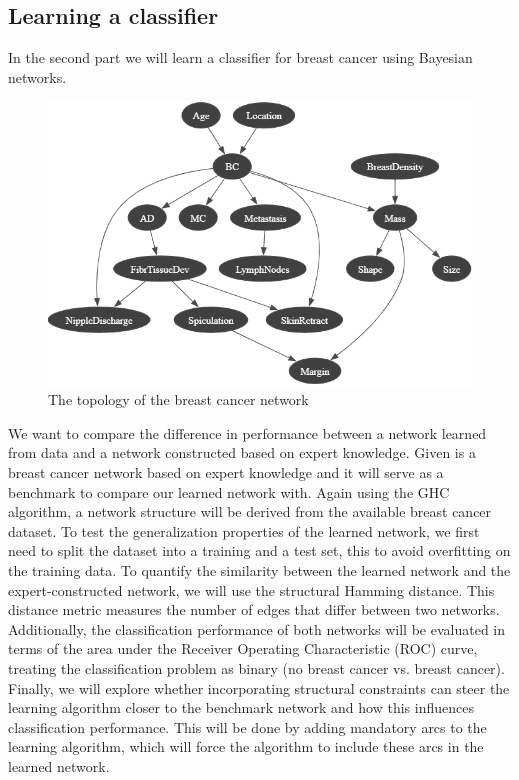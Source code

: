\documentclass{article}
\begin{document}
\subsection{Learning a classifier}
In the second part we will learn a classifier for breast cancer using Bayesian networks.
\begin{figure}[H]
    \centering
    \includegraphics[width=\textwidth]{../figures/Breast_cancer_network_topology.png}
    \caption{The topology of the breast cancer network}
    \label{fig:top_breast}
\end{figure}
We want to compare the difference in performance between a network learned from data and a network constructed based on expert knowledge.
Given is a breast cancer network based on expert knowledge and it will serve as a benchmark to compare our learned network with.
Again using the GHC algorithm, a network structure will be derived from the available breast cancer dataset.
To test the generalization properties of the learned network, we first need to split the dataset into a training and a test set, this to avoid overfitting on the training data.
To quantify the similarity between the learned network and the expert-constructed network, we will use the structural Hamming distance. 
This distance metric measures the number of edges that differ between two networks.
Additionally, the classification performance of both networks will be evaluated in terms of the area under the Receiver Operating Characteristic (ROC) curve,
treating the classification problem as binary (no breast cancer vs. breast cancer).
Finally, we will explore whether incorporating structural constraints can steer the learning algorithm closer to the benchmark network and how this influences classification performance.
This will be done by adding mandatory arcs to the learning algorithm, which will force the algorithm to include these arcs in the learned network.
\end{document}
